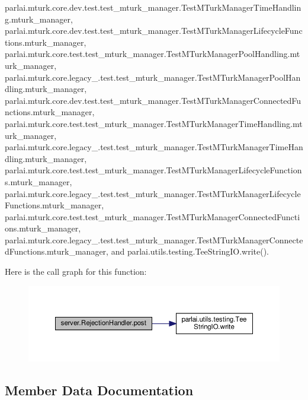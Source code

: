 parlai.\+mturk.\+core.\+dev.\+test.\+test\+\_\+mturk\+\_\+manager.\+Test\+M\+Turk\+Manager\+Time\+Handling.\+mturk\+\_\+manager, parlai.\+mturk.\+core.\+dev.\+test.\+test\+\_\+mturk\+\_\+manager.\+Test\+M\+Turk\+Manager\+Lifecycle\+Functions.\+mturk\+\_\+manager, parlai.\+mturk.\+core.\+test.\+test\+\_\+mturk\+\_\+manager.\+Test\+M\+Turk\+Manager\+Pool\+Handling.\+mturk\+\_\+manager, parlai.\+mturk.\+core.\+legacy\+\_.\+test.\+test\+\_\+mturk\+\_\+manager.\+Test\+M\+Turk\+Manager\+Pool\+Handling.\+mturk\+\_\+manager, parlai.\+mturk.\+core.\+dev.\+test.\+test\+\_\+mturk\+\_\+manager.\+Test\+M\+Turk\+Manager\+Connected\+Functions.\+mturk\+\_\+manager, parlai.\+mturk.\+core.\+test.\+test\+\_\+mturk\+\_\+manager.\+Test\+M\+Turk\+Manager\+Time\+Handling.\+mturk\+\_\+manager, parlai.\+mturk.\+core.\+legacy\+\_.\+test.\+test\+\_\+mturk\+\_\+manager.\+Test\+M\+Turk\+Manager\+Time\+Handling.\+mturk\+\_\+manager, parlai.\+mturk.\+core.\+test.\+test\+\_\+mturk\+\_\+manager.\+Test\+M\+Turk\+Manager\+Lifecycle\+Functions.\+mturk\+\_\+manager, parlai.\+mturk.\+core.\+legacy\+\_.\+test.\+test\+\_\+mturk\+\_\+manager.\+Test\+M\+Turk\+Manager\+Lifecycle\+Functions.\+mturk\+\_\+manager, parlai.\+mturk.\+core.\+test.\+test\+\_\+mturk\+\_\+manager.\+Test\+M\+Turk\+Manager\+Connected\+Functions.\+mturk\+\_\+manager, parlai.\+mturk.\+core.\+legacy\+\_.\+test.\+test\+\_\+mturk\+\_\+manager.\+Test\+M\+Turk\+Manager\+Connected\+Functions.\+mturk\+\_\+manager, and parlai.\+utils.\+testing.\+Tee\+String\+I\+O.\+write().

Here is the call graph for this function\+:
\nopagebreak
\begin{figure}[H]
\begin{center}
\leavevmode
\includegraphics[width=350pt]{classserver_1_1RejectionHandler_ac442a5bf81064a282b5f2ff706ab5b6b_cgraph}
\end{center}
\end{figure}


\subsection{Member Data Documentation}
\mbox{\label{classserver_1_1RejectionHandler_af3a107fe511028a0c1ac4a9eee90f68c}} 
